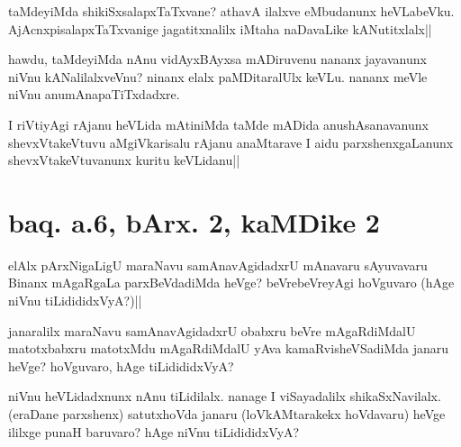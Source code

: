 \begin{artha}
taMdeyiMda shikiSxsalapxTaTxvane? athavA ilalxve eMbudanunx 
heVLabeVku. AjAcnxpisalapxTaTxvanige jagatitxnalilx iMtaha naDavaLike 
kANutitxlalx||
\end{artha}


\begin{artha}
hawdu, taMdeyiMda nAnu vidAyxBAyxsa mADiruvenu nananx jayavanunx niVnu 
kANalilalxveVnu? ninanx elalx paMDitaralUlx keVLu. nananx meVle niVnu 
anumAnapaTiTxdadxre.
\end{artha}

\begin{artha}
I riVtiyAgi rAjanu heVLida mAtiniMda taMde mADida anushAsanavanunx 
shevxVtakeVtuvu aMgiVkarisalu rAjanu anaMtarave I aidu 
parxshenxgaLanunx shevxVtakeVtuvanunx kuritu keVLidanu||
\end{artha}

\section*{baq. a.6, bArx. 2, kaMDike 2}

\stext


\begin{artha}
elAlx pArxNigaLigU maraNavu samAnavAgidadxrU mAnavaru sAyuvavaru 
Binanx mAgaRgaLa parxBeVdadiMda heVge? beVrebeVreyAgi hoVguvaro (hAge 
niVnu tiLidididxVyA?)||
\end{artha}


\begin{artha}
janaralilx maraNavu samAnavAgidadxrU obabxru beVre mAgaRdiMdalU 
matotxbabxru matotxMdu mAgaRdiMdalU yAva kamaRvisheVSadiMda janaru 
heVge? hoVguvaro, hAge tiLidididxVyA?
\end{artha}


\begin{artha}
niVnu heVLidadxnunx nAnu tiLidilalx. nanage I viSayadalilx 
shikaSxNavilalx. (eraDane parxshenx) satutxhoVda janaru 
(loVkAMtarakekx hoVdavaru) heVge ililxge punaH baruvaro? hAge niVnu 
tiLidididxVyA? 
\end{artha}



